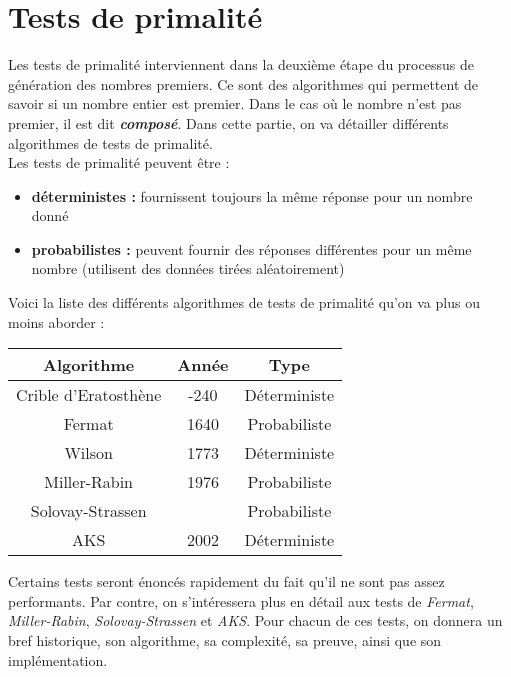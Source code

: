 \section{Tests de primalité}

	Les tests de primalité interviennent dans la deuxième étape du processus de génération des nombres premiers. Ce sont des algorithmes qui permettent de savoir si un nombre entier est premier. Dans le cas où le nombre n'est pas premier, il est dit \textbf{\textit{composé}}. Dans cette partie, on va détailler différents algorithmes de tests de primalité.\\
	Les tests de primalité peuvent être :
	\begin{itemize}[leftmargin=*]
		\item \textbf{déterministes :} fournissent toujours la même réponse pour un nombre donné
		\item \textbf{probabilistes :} peuvent fournir des réponses différentes pour un même nombre (utilisent des données tirées aléatoirement)
	\end{itemize}
	
	Voici la liste des différents algorithmes de tests de primalité qu'on va plus ou moins aborder :
	\begin{table}[H]\begin{center}
		\begin{tabular}{|c|c|c|}
		\hline
		Algorithme           & Année & Type       \\ \hline
		Crible d’Eratosthène & -240  & Déterministe \\ \hline
		Fermat               & 1640  & Probabiliste \\ \hline
		Wilson               & 1773  & Déterministe \\ \hline
		Miller-Rabin         & 1976  & Probabiliste \\ \hline
		Solovay-Strassen     & ~     & Probabiliste \\ \hline
		AKS                  & 2002  & Déterministe \\ \hline
		\end{tabular}
	\end{center}\end{table}
	
	Certains tests seront énoncés rapidement du fait qu'il ne sont pas assez performants. Par contre, on s'intéressera plus en détail aux tests de \textit{Fermat}, \textit{Miller-Rabin}, \textit{Solovay-Strassen} et \textit{AKS}. Pour chacun de ces tests, on donnera un bref historique, son algorithme, sa complexité, sa preuve, ainsi que son implémentation.
	
	
	
	
	
	
	